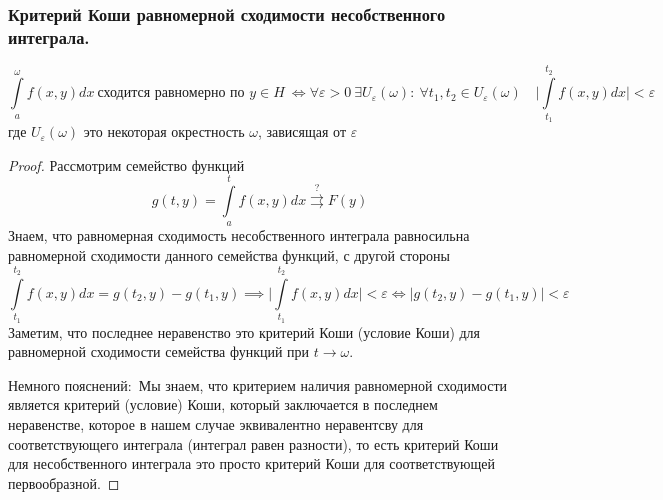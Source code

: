 \subsubsection{Критерий Коши равномерной сходимости несобственного интеграла.}
\begin{theorem*}
    \begin{equation*}
        \int\limits_a^\omega f(x,y)dx\ \text{сходится равномерно по }  y\in H\ \iff \forall \varepsilon > 0 \ \exists U_{\varepsilon}(\omega)\colon\ \forall t_1, t_2\in U_{\varepsilon}(\omega)\quad \Big|\int\limits_{t_1}^{t_2} f(x,y)dx \Big| < \varepsilon
    \end{equation*}
    где $U_{\varepsilon}(\omega)$ это некоторая окрестность $\omega$, зависящая от $\varepsilon$
\end{theorem*}
\begin{proof}
    Рассмотрим семейство функций \begin{equation*}g(t,y)=\int\limits_a^t f(x,y)dx\overset{?}{\rightrightarrows} F(y)\end{equation*}
    Знаем, что равномерная сходимость несобственного интеграла равносильна равномерной сходимости данного семейства функций, с другой стороны
    \begin{equation*}
        \int\limits_{t_1}^{t_2} f(x,y)dx=g(t_2, y)- g(t_1,y)\implies \Big|\int\limits_{t_1}^{t_2} f(x,y)dx \Big| < \varepsilon \iff |g(t_2, y)- g(t_1,y)| < \varepsilon
    \end{equation*}
    Заметим, что последнее неравенство это критерий Коши (условие Коши) для равномерной сходимости семейства функций при $t\to \omega$.
    
    $\textit{Немного пояснений}\colon$ Мы знаем, что критерием наличия равномерной сходимости является критерий (условие) Коши, который заключается в последнем неравенстве, которое в нашем случае эквивалентно неравентсву для соответствующего интеграла (интеграл равен разности), то есть критерий Коши для несобственного интеграла это просто критерий Коши для соответствующей первообразной.
\end{proof}

